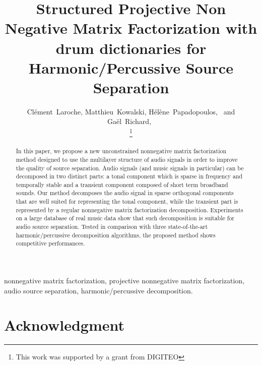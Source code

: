 \documentclass[journal]{IEEEtran}
\begin{document}
\title{Structured Projective Non Negative Matrix Factorization with drum dictionaries for Harmonic/Percussive Source Separation}

\author{Cl\'{e}ment~Laroche,
        Matthieu~Kowalski,
        H\'{e}l\`{e}ne~Papadopoulos,~
        and Ga\"{el}~Richard,~%
        
\thanks{This work was supported by a grant from DIGITEO}}



\maketitle


\begin{abstract}
In this paper, we propose a new unconstrained nonnegative matrix factorization method designed to use the multilayer structure of audio signals in order to improve the quality of source separation. Audio signals (and music signals in particular) can be decomposed in two distinct parts: a tonal component which is sparse in frequency and temporally stable and a transient component composed of short term broadband sounds. Our method decomposes the audio signal in sparse orthogonal components that are well suited for representing the tonal component, while the transient part is represented by a regular nonnegative matrix factorization decomposition. Experiments on a large database of real music data show that such decomposition is suitable for audio source separation. Tested in comparison with three state-of-the-art harmonic/percussive decomposition algorithms, the proposed method shows competitive performances.
\end{abstract}


\begin{IEEEkeywords}
nonnegative matrix factorization, projective nonnegative matrix factorization, audio source separation, harmonic/percussive decomposition.
\end{IEEEkeywords}

















\section*{Acknowledgment}






\end{document}
